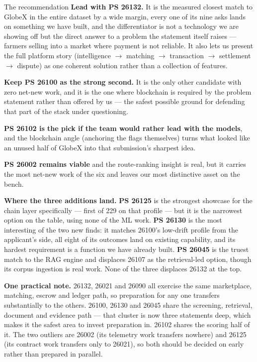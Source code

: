 \documentclass[11pt]{article}
\begin{document}
\vspace{1.4em}
\begin{callout}{The recommendation}
\textbf{Lead with PS 26132.} It is the measured closest match to GlobeX in the entire dataset by a wide
margin, every one of its nine asks lands on something we have built, and the differentiator is not a
technology we are showing off but the direct answer to a problem the statement itself raises --- farmers
selling into a market where payment is not reliable. It also lets us present the full platform story
(intelligence $\rightarrow$ matching $\rightarrow$ transaction $\rightarrow$ settlement $\rightarrow$
dispute) as one coherent solution rather than a collection of features.

\vspace{0.6em}
\textbf{Keep PS 26100 as the strong second.} It is the only other candidate with zero net-new work, and
it is the one where blockchain is required by the problem statement rather than offered by us --- the
safest possible ground for defending that part of the stack under questioning.

\vspace{0.6em}
\textbf{PS 26102 is the pick if the team would rather lead with the models}, and the blockchain angle
(anchoring the flags themselves) turns what looked like an unused half of GlobeX into that submission's
sharpest idea.

\vspace{0.6em}
\textbf{PS 26002 remains viable} and the route-ranking insight is real, but it carries the most net-new
work of the six and leaves our most distinctive asset on the bench.
\end{callout}

\vspace{0.9em}
\noindent\textbf{Where the three additions land.} \textbf{PS 26125} is the strongest showcase for the
chain layer specifically --- first of 229 on that profile --- but it is the narrowest option on the table,
using none of the ML work. \textbf{PS 26130} is the most interesting of the two new finds: it matches
26100's low-drift profile from the applicant's side, all eight of its outcomes land on existing
capability, and its hardest requirement is a function we have already built. \textbf{PS 26045} is the
truest match to the RAG engine and displaces 26107 as the retrieval-led option, though its corpus
ingestion is real work. None of the three displaces 26132 at the top.

\vspace{0.9em}
\noindent\textbf{One practical note.} 26132, 26021 and 26090 all exercise the same marketplace, matching,
escrow and ledger path, so preparation for any one transfers substantially to the others. 26100, 26130 and
26045 share the screening, retrieval, document and evidence path --- that cluster is now three statements
deep, which makes it the safest area to invest preparation in. 26102 shares the scoring half of it. The
two outliers are 26002 (its telemetry work transfers nowhere) and 26125 (its contract work transfers only
to 26021), so both should be decided on early rather than prepared in parallel.
\end{document}

